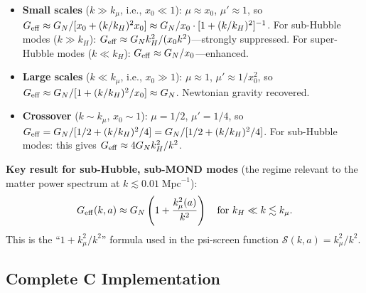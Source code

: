 \documentclass[11pt]{article}
\theoremstyle{definition}
\theoremstyle{remark}
\newcommand{\Geff}{G_{\rm eff}}
\begin{document}
\begin{itemize}
\item \textbf{Small scales} ($k \gg k_\mu$, i.e., $x_0 \ll 1$):
  $\mu \approx x_0$, $\mu' \approx 1$, so
  $\Geff \approx G_N / [x_0 + (k/k_H)^2 x_0] \approx G_N / x_0
  \cdot [1 + (k/k_H)^2]^{-1}$. For sub-Hubble modes ($k \gg k_H$):
  $\Geff \approx G_N k_H^2 / (x_0 k^2)$---strongly suppressed.
  For super-Hubble modes ($k \ll k_H$): $\Geff \approx G_N / x_0$---enhanced.

\item \textbf{Large scales} ($k \ll k_\mu$, i.e., $x_0 \gg 1$):
  $\mu \approx 1$, $\mu' \approx 1/x_0^2$, so
  $\Geff \approx G_N / [1 + (k/k_H)^2 / x_0] \approx G_N$.
  Newtonian gravity recovered.

\item \textbf{Crossover} ($k \sim k_\mu$, $x_0 \sim 1$):
  $\mu = 1/2$, $\mu' = 1/4$, so
  $\Geff = G_N / [1/2 + (k/k_H)^2/4] = G_N / [1/2 + (k/k_H)^2/4]$.
  For sub-Hubble modes: this gives $\Geff \approx 4 G_N k_H^2 / k^2$.
\end{itemize}

\textbf{Key result for sub-Hubble, sub-MOND modes} (the regime relevant
to the matter power spectrum at $k \lesssim 0.01\;\text{Mpc}^{-1}$):
\begin{equation}
  \Geff(k,a) \approx G_N \left(1 + \frac{k_\mu^2(a)}{k^2}\right)
  \quad \text{for } k_H \ll k \lesssim k_\mu.
  \label{eq:geff-approx}
\end{equation}
This is the ``$1 + k_\mu^2/k^2$'' formula used in the psi-screen
function $\mathcal{S}(k,a) = k_\mu^2/k^2$.

\subsection{Complete C Implementation}
\end{document}
